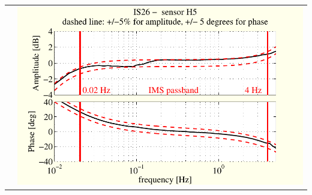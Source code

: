 \documentclass[handout,9pt]{beamer}
\begin{document}
\begin{frame}
\begin{tabular}{c||c}
&
\includegraphics[scale=0.35]{3monthsonIS26SUTboxplot5.pdf}
\end{tabular}
\end{frame}
\end{document}
